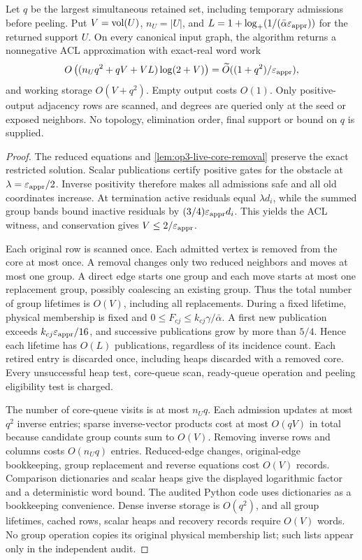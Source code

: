 \begin{theorem}
\label{thm:op3-live-core-peeling}
Let $q$ be the largest simultaneous retained set, including temporary
admissions before peeling. Put $V=\operatorname{vol}(U)$, $n_U=|U|$, and
$L=1+\log_+(1/(\bar\alpha\varepsilon_{\mathrm{appr}}))$ for the returned support $U$.
On every canonical input graph, the algorithm returns a nonnegative ACL
approximation with exact-real word work
\begin{equation}
 O\left((n_Uq^2+qV+VL)\log(2+V)\right)
 =\widetilde O((1+q^2)/\varepsilon_{\mathrm{appr}}),
 \label{eq:op3-live-core-work}
\end{equation}
and working storage $O(V+q^2)$. Empty output costs $O(1)$.
Only positive-output adjacency rows are scanned, and degrees are queried
only at the seed or exposed neighbors. No topology, elimination order,
final support or bound on $q$ is supplied.
\end{theorem}
\begin{proof}
The reduced equations and \cref{lem:op3-live-core-removal} preserve the exact
restricted solution. Scalar publications certify positive gates for the
obstacle at $\lambda=\varepsilon_{\mathrm{appr}}/2$. Inverse positivity therefore makes all
admissions safe and all old coordinates increase. At termination active
residuals equal $\lambda d_i$, while the summed group bands bound inactive
residuals by $(3/4)\varepsilon_{\mathrm{appr}} d_i$. This yields the ACL witness, and
conservation gives $V\leq2/\varepsilon_{\mathrm{appr}}$.

Each original row is scanned once. Each admitted vertex is removed from
the core at most once. A removal changes only two reduced neighbors and
moves at most one group. A direct edge starts one group and each move
starts at most one replacement group, possibly coalescing an existing
group. Thus the total number of group lifetimes is $O(V)$, including all
replacements. During a fixed lifetime, physical membership is fixed and
$0\leq F_{cj}\leq k_{cj}\gamma/\bar\alpha$. A first new publication
exceeds $k_{cj}\varepsilon_{\mathrm{appr}}/16$, and successive publications grow by more
than $5/4$. Hence each lifetime has $O(L)$ publications, regardless of its
incidence count. Each retired entry is discarded once, including heaps
discarded with a removed core. Every unsuccessful heap test, core-queue
scan, ready-queue operation and peeling eligibility test is charged.

The number of core-queue visits is at most $n_Uq$. Each admission updates
at most $q^2$ inverse entries; sparse inverse-vector products cost at most
$O(qV)$ in total because candidate group counts sum to $O(V)$. Removing
inverse rows and columns costs $O(n_Uq)$ entries. Reduced-edge changes,
original-edge bookkeeping, group replacement and reverse equations cost
$O(V)$ records. Comparison dictionaries and scalar heaps give the displayed
logarithmic factor and a deterministic word bound. The audited Python code
uses dictionaries as a bookkeeping convenience. Dense inverse storage is
$O(q^2)$, and all group lifetimes, cached rows, scalar heaps and recovery
records require $O(V)$ words. No group operation copies its original
physical membership list; such lists appear only in the independent audit.
\end{proof}

